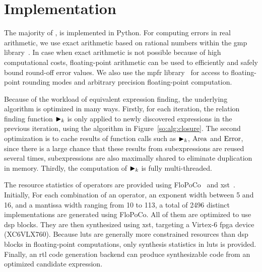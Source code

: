 \section{Implementation}
\label{so:sec:implementation}

The majority of \soap, is implemented in Python.  For computing errors in
real arithmetic, we use exact arithmetic based on rational numbers within the
\gls{gmp} library~\cite{gmp}.  In case when exact arithmetic is not possible
because of high computational costs, floating-point arithmetic can be used
to efficiently and safely bound round-off error values.  We also use the
\gls{mpfr} library~\cite{mpfr} for access to floating-point rounding modes and
arbitrary precision floating-point computation.

Because of the workload of equivalent expression finding, the underlying
algorithm is optimized in many ways.  Firstly, for each iteration, the relation
finding function $\operatorname{\blacktriangleright}_k$ is only applied to newly discovered expressions
in the previous iteration, using the algorithm in Figure~\ref{so:alg:closure}.
The second optimization is to cache results of function calls such as
$\operatorname{\blacktriangleright}_k$, $\operatorname{\mathrm{Area}}$ and $\operatorname{\mathrm{Error}}$, since there is a large chance that these
results from subexpressions are reused several times, subexpressions are also
maximally shared to eliminate duplication in memory.  Thirdly, the computation
of $\operatorname{\blacktriangleright}_k$ is fully multi-threaded.

The resource statistics of operators are provided using FloPoCo~\cite{flopoco}
and \gls{xst}~\cite{xst}.  Initially, For each combination of an operator, an
exponent width between 5 and 16, and a mantissa width ranging from 10 to 113,
a total of 2496 distinct implementations are generated using FloPoCo.  All
of them are optimized to use \gls{dsp} blocks.  They are then synthesized
using \gls{xst}, targeting a Virtex-6 \gls{fpga} device (XC6VLX760).  Because
\glspl{lut} are generally more constrained resources than \gls{dsp} blocks
in floating-point computations, only synthesis statistics in \glspl{lut}
is provided.  Finally, an \gls{rtl} code generation backend can produce
synthesizable code from an optimized candidate expression.
